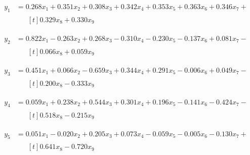 \begin{frame}

    \footnotesize
    \begin{align*}
        y_1 &= 0.268x_1+0.351x_2+0.308x_3+0.342x_4+ 0.353x_5+0.363x_6+ 0.346x_7+\\
           &\quad \ \begin{multlined}[t]
            0.329x_8+0.330x_9
           \end{multlined}
    \end{align*}
    
    \begin{align*}
        y_2&=0.822x_1 -0.263x_2 + 0.268x_3 -0.310x_4 -0.230x_5 -0.137x_6 + 0.081x_7 - \\
        & \quad \ \begin{multlined}[t]
            0.066x_8 + 0.059x_9
        \end{multlined}
    \end{align*}

    \begin{align*}
        y_3 &=0.451x_1 + 0.066x_2 -0.659x_3 + 0.344x_4+  0.291x_5 -0.006x_6 + 0.049x_7 - \\
        &\quad \ \begin{multlined}[t]
            0.200x_8 -0.333x_9
        \end{multlined}
    \end{align*}

    \begin{align*}
        y_4 &= 0.059x_1 + 0.238x_2 + 0.544x_3 + 0.301x_4 + 0.196x_5 -0.141x_6 -0.424x_7 - \\
        &\quad \ \begin{multlined}[t]
            0.518x_8 -0.215x_9
        \end{multlined}
    \end{align*}

    \begin{align*}
        y_5 &= 0.051x_1 -0.020x_2 + 0.205x_3 + 0.073x_4 -0.059x_5 -0.005x_6 -0.130x_7 + \\
        & \quad \ \begin{multlined}[t]
            0.641x_8 -0.720x_9
        \end{multlined}
    \end{align*}

\end{frame}

